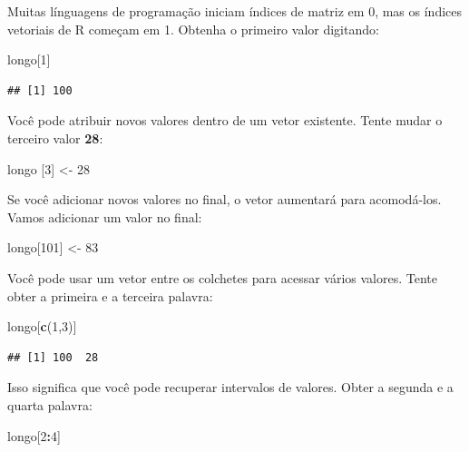 \documentclass[
]{book}
\newenvironment{Shaded}{\begin{snugshade}}{\end{snugshade}}
\newcommand{\DecValTok}[1]{\textcolor[rgb]{0.00,0.00,0.81}{#1}}
\newcommand{\KeywordTok}[1]{\textcolor[rgb]{0.13,0.29,0.53}{\textbf{#1}}}
\newcommand{\NormalTok}[1]{#1}
\newcommand{\OperatorTok}[1]{\textcolor[rgb]{0.81,0.36,0.00}{\textbf{#1}}}
\newcommand{\StringTok}[1]{\textcolor[rgb]{0.31,0.60,0.02}{#1}}
\begin{document}
Muitas línguagens de programação iniciam índices de matriz em 0, mas os índices vetoriais de R começam em 1. Obtenha o primeiro valor digitando:

\begin{Shaded}
\begin{Highlighting}[]
\NormalTok{longo[}\DecValTok{1}\NormalTok{]}
\end{Highlighting}
\end{Shaded}

\begin{verbatim}
## [1] 100
\end{verbatim}

Você pode atribuir novos valores dentro de um vetor existente. Tente mudar o terceiro valor \textbf{28}:

\begin{Shaded}
\begin{Highlighting}[]
\NormalTok{longo [}\DecValTok{3}\NormalTok{] <-}\StringTok{ }\DecValTok{28}
\end{Highlighting}
\end{Shaded}

Se você adicionar novos valores no final, o vetor aumentará para acomodá-los. Vamos adicionar um valor no final:

\begin{Shaded}
\begin{Highlighting}[]
\NormalTok{longo[}\DecValTok{101}\NormalTok{] <-}\StringTok{ }\DecValTok{83}
\end{Highlighting}
\end{Shaded}

Você pode usar um vetor entre os colchetes para acessar vários valores. Tente obter a primeira e a terceira palavra:

\begin{Shaded}
\begin{Highlighting}[]
\NormalTok{longo[}\KeywordTok{c}\NormalTok{(}\DecValTok{1}\NormalTok{,}\DecValTok{3}\NormalTok{)]}
\end{Highlighting}
\end{Shaded}

\begin{verbatim}
## [1] 100  28
\end{verbatim}

Isso significa que você pode recuperar intervalos de valores. Obter a segunda e a quarta palavra:

\begin{Shaded}
\begin{Highlighting}[]
\NormalTok{longo[}\DecValTok{2}\OperatorTok{:}\DecValTok{4}\NormalTok{]}
\end{Highlighting}
\end{Shaded}
\end{document}
